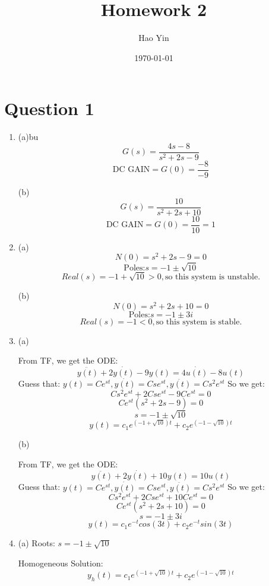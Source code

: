 \documentclass[12pt]{article}
\begin{document}
\title{Homework 2}
\author{Hao Yin}
\date{\today}
\maketitle

\section*{Question 1}
    \begin{enumerate}[label=\roman*.]
        \item (a)bu
        \[G(s) = \frac{4s-8}{s^2+2s-9}\]
        \[\text{DC GAIN} = G(0) = \frac{-8}{-9}\]

        (b)
        \[G(s) = \frac{10}{s^2+2s+10}\]
        \[\text{DC GAIN} = G(0) = \frac{10}{10} = 1\]

        \item (a)
        \[N(0) = s^2+2s-9 = 0\]
        \[\text{Poles:} s = -1 \pm \sqrt{10}\]
        \[Real(s) = -1 + \sqrt{10} > 0, \text{so this system is unstable.}\]

        (b)
        \[N(0) = s^2+2s+10 = 0\]
        \[\text{Poles:} s = -1 \pm 3i\]
        \[Real(s) = -1 < 0, \text{so this system is stable.}\]

        \item (a)
        
        From TF, we get the ODE:
        \[\ddot{y(t)} + 2\dot{y(t)} - 9y(t) = 4\dot{u(t)} - 8u(t)\]
        Guess that: $y(t) = Ce^{st}, \dot{y(t)} = Cse^{st}, 
            \ddot{y(t)} = Cs^2e^{st}$
        So we get:
        \[Cs^2e^{st} + 2Cse^{st} - 9Ce^{st} = 0\]
        \[Ce^{st} (s^2 + 2s - 9) = 0\]
        \[s = -1 \pm \sqrt{10}\]
        \[y(t) = c_1e^{(-1+\sqrt{10})t} + c_2e^{(-1-\sqrt{10})t}\]

        (b)

        From TF, we get the ODE:
        \[\ddot{y(t)} + 2\dot{y(t)} + 10y(t) = 10u(t)\]
        Guess that: $y(t) = Ce^{st}, \dot{y(t)} = Cse^{st}, 
            \ddot{y(t)} = Cs^2e^{st}$
        So we get:
        \[Cs^2e^{st} + 2Cse^{st} + 10Ce^{st} = 0\]
        \[Ce^{st} (s^2 + 2s + 10) = 0\]
        \[s = -1 \pm 3i\]
        \[y(t) = c_1e^{-t}cos(3t) + c_2e^{-t}sin(3t)\]

        \item (a)
        Roots: $s = -1 \pm \sqrt{10}$

        Homogeneous Solution: 
        \[y_h(t) = c_1e^{(-1+\sqrt{10})t} + c_2e^{(-1-\sqrt{10})t}\]


\end{enumerate}
\end{document}
